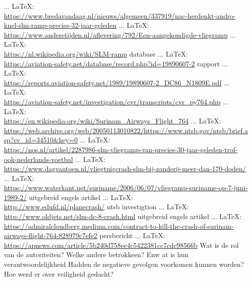 \begin{thebibliography}{99}
{{{{{{{							 ... \LaTeX:\\ \url{https://www.bredavandaag.nl/nieuws/algemeen/337919/nac-herdenkt-andro-knel-slm-ramp-precies-32-jaar-geleden}
							 ... \LaTeX:\\ \url{https://www.anderetijden.nl/aflevering/792/Een-aangekondigde-vliegramp}
							 ... \LaTeX:\\ \url{https://nl.wikipedia.org/wiki/SLM-ramp}
							database
							 ... \LaTeX:\\ \url{https://aviation-safety.net/database/record.php?id=19890607-2}
							rapport
							 ... \LaTeX:\\ \url{https://reports.aviation-safety.net/1989/19890607-2_DC86_N1809E.pdf}
							 ... \LaTeX:\\ \url{https://aviation-safety.net/investigation/cvr/transcripts/cvr_py764.php}
							 ... \LaTeX:\\ \url{https://en.wikipedia.org/wiki/Surinam_Airways_Flight_764}
							 ... \LaTeX:\\ \url{https://web.archive.org/web/20050113010822/https://www.ntsb.gov/ntsb/brief.asp?ev_id=34510&key=0}
							 ... \LaTeX:\\ \url{https://nos.nl/artikel/2287986-slm-vliegramp-van-precies-30-jaar-geleden-trof-ook-nederlands-voetbal}
							 ... \LaTeX:\\ \url{https://www.dagvantoen.nl/vliegtuigcrash-slm-bij-zanderij-meer-dan-170-doden/}
							 ... \LaTeX:\\ \url{https://www.waterkant.net/suriname/2006/06/07/vliegramp-suriname-op-7-juni-1989-2/}
							uitgebreid engels artikel
							 ... \LaTeX:\\ \url{http://www.edufd.nl/planecrash/}
							ntsb investigtion
							 ... \LaTeX:\\ \url{http://www.oldjets.net/slm-dc-8-crash.html}
							uitgebreid engels artikel
							 ... \LaTeX:\\ \url{https://admiralcloudberg.medium.com/contract-to-kill-the-crash-of-surinam-airways-flight-764-828979c7efe2}
							persbericht
							 ... \LaTeX:\\ \url{https://apnews.com/article/5b240d758ee4c5422381cc7cdc98566b}
							Wat is de rol van de autoriteiten?
							Welke andere betrokkeen? Enw at is hun verantwoordelijkheid
							Hadden de negatieve gevolgen voorkomen kunnen worden?
							Hoe werd er over veiligheid gedacht?
							
}}}}}}}
\end{thebibliography}
